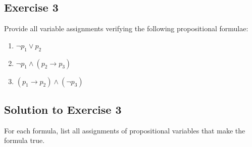 \documentclass[11pt]{article}
\begin{document}
    
    \subsection*{Exercise 3}

    Provide all variable assignments verifying the following propositional formulae:

    \begin{enumerate}
        \item $\neg p_1 \vee p_2$
        \item $\neg p_1 \wedge (p_2 \rightarrow p_3)$
        \item $(p_1 \rightarrow p_2) \wedge (\neg p_3)$
    \end{enumerate}

    \subsection*{Solution to Exercise 3}

    For each formula, list all assignments of propositional variables that make the formula true.
\end{document}
